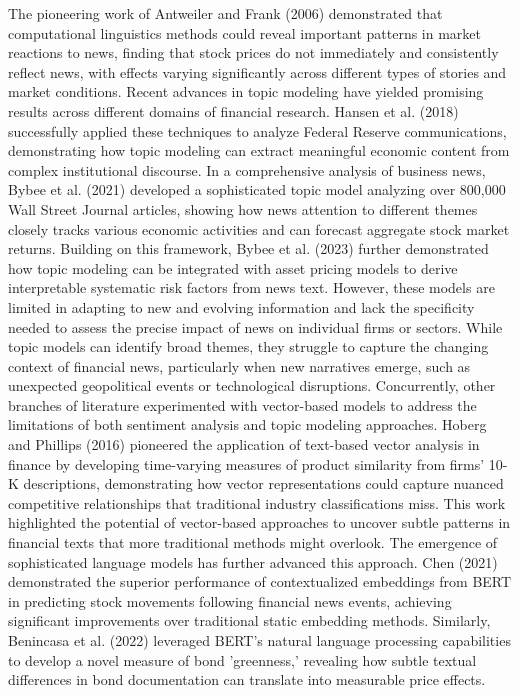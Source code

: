 The pioneering work of Antweiler and Frank (2006) demonstrated that computational linguistics methods could reveal important patterns in market reactions to news, finding that stock prices do not immediately and consistently reflect news, with effects varying significantly across different types of stories and market conditions.
Recent advances in topic modeling have yielded promising results across different domains of financial research. Hansen et al. (2018) successfully applied these techniques to analyze Federal Reserve communications, demonstrating how topic modeling can extract meaningful economic content from complex institutional discourse. In a comprehensive analysis of business news, Bybee et al. (2021) developed a sophisticated topic model analyzing over 800,000 Wall Street Journal articles, showing how news attention to different themes closely tracks various economic activities and can forecast aggregate stock market returns. Building on this framework, Bybee et al. (2023) further demonstrated how topic modeling can be integrated with asset pricing models to derive interpretable systematic risk factors from news text.
However, these models are limited in adapting to new and evolving information and lack the specificity needed to assess the precise impact of news on individual firms or sectors. While topic models can identify broad themes, they struggle to capture the changing context of financial news, particularly when new narratives emerge, such as unexpected geopolitical events or technological disruptions.
Concurrently, other branches of literature experimented with vector-based models to address the limitations of both sentiment analysis and topic modeling approaches. Hoberg and Phillips (2016) pioneered the application of text-based vector analysis in finance by developing time-varying measures of product similarity from firms' 10-K descriptions, demonstrating how vector representations could capture nuanced competitive relationships that traditional industry classifications miss. This work highlighted the potential of vector-based approaches to uncover subtle patterns in financial texts that more traditional methods might overlook.
The emergence of sophisticated language models has further advanced this approach. Chen (2021) demonstrated the superior performance of contextualized embeddings from BERT in predicting stock movements following financial news events, achieving significant improvements over traditional static embedding methods. Similarly, Benincasa et al. (2022) leveraged BERT's natural language processing capabilities to develop a novel measure of bond 'greenness,' revealing how subtle textual differences in bond documentation can translate into measurable price effects.
